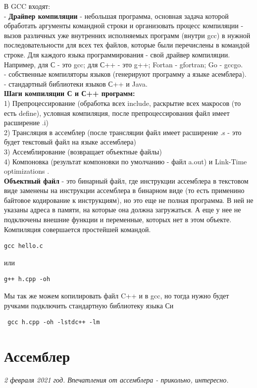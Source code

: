 \documentclass[12pt]{article}
\begin{document}
 В GCC входят: \\
- \textbf{Драйвер компиляции} - небольшая программа, основная задача которой обработать аргументы командной строки и организовать процесс компиляции - вызов различных уже внутренних исполняемых программ (внутри gcc) в нужной последовательности для всех тех файлов, которые были перечислены в командой строке. Для каждого языка программирования - свой драйвер компиляции. Например, для С - это gcc; для С++ - это g++; Fortan - gfortran; Go - gccgo. \\
- собственные компиляторы языков (генерируют программу а языке асемблера). \\
- стандартный библиотеки языков С++ и Java. \\

\textbf{Шаги компиляции С и С++ программ:} \\
1) Препроцессирование (обработка всех include, раскрытие всех макросов (то есть define), условная компиляция, после препроцессирования файл имеет расширение .i) \\
2) Трансляция в ассемблер (после трансляции файл имеет расширение .s - это будет текстовый файл на языке ассемблера)\\
3) Ассемблирование (возвращает объектные файлы) \\
4) Компоновка (результат компоновки по умолчанию - файл a.out) и Link-Time optimizations . \\

\textbf{Объектный файл} - это бинарный файл, где инструкции ассемблера в текстовом виде заменены на инструкции ассемблера в бинарном виде (то есть применино байтовое кодирование к инструкциям), но это еще не полная программа. В ней не указаны адреса в памяти, на которые она должна загружаться. А еще у нее не подключены внешние функции и переменные, которых нет в этом объекте. \\

Компиляция совершается простейшей командой. 
\begin{verbatim}
gcc hello.c
\end{verbatim}
или 
\begin{verbatim}
g++ h.cpp -oh
\end{verbatim}
 Мы так же можем копилировать файл C++ и в gcc, но тогда нужно будет ручками подключить стандартную библиотеку языка Си
 \begin{verbatim}
 gcc h.cpp -oh -lstdc++ -lm
 \end{verbatim}
 
 \section{Ассемблер}
 \textit{2 февраля 2021 год. Впечатления от ассемблера - прикольно, интересно.} \\
 
\end{document}
